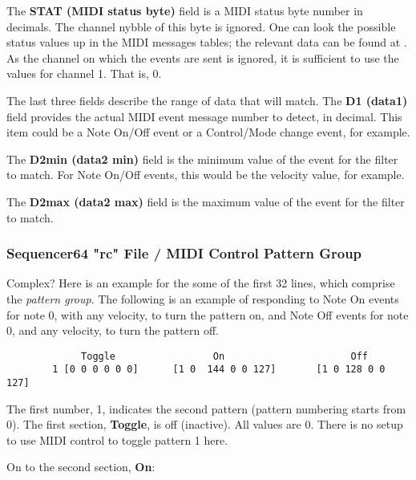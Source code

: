    The \textbf{STAT (MIDI status byte)} field is a MIDI status byte number in
   decimals.  The channel nybble of this byte is ignored.  One can look the
   possible status values up in the MIDI messages tables; the relevant data can
   be found at \cite{midicontroltable}.  As the channel on which the events are
   sent is ignored, it is sufficient to use the values for channel 1.  That is,
   0.

   The last three fields describe the range of data that will match.  The
   \textbf{D1 (data1)} field provides the actual MIDI event message number to
   detect, in decimal.  This item could be a Note On/Off event or a
   Control/Mode change event, for example.

   The \textbf{D2min (data2 min)} field is the minimum value of the event for
   the filter to match. For Note On/Off events, this would be the velocity
   value, for example.

   The \textbf{D2max (data2 max)} field is the maximum value of the event for
   the filter to match.

\subsubsection{Sequencer64 "rc" File / MIDI Control Pattern Group}
\label{subsubsec:seq64_rc_file_midi_control_pattern_group}

   Complex?  Here is an example for the some of the first 32 lines, which
   comprise the \textsl{pattern group}.
   The following is an example of responding
   to Note On events for note 0, with any velocity, to turn the pattern on,
   and Note Off events for note 0, and any velocity, to turn the pattern
   off.

   \begin{verbatim}
             Toggle                 On                      Off
        1 [0 0 0 0 0 0]      [1 0  144 0 0 127]       [1 0 128 0 0 127]
   \end{verbatim}

   The first number, 1, indicates the second pattern (pattern numbering starts
   from 0).
   The first section, \textbf{Toggle}, is off (inactive).  All values are 0.
   There is no setup to use MIDI control to toggle pattern 1 here.
   
   On to the second section, \textbf{On}:

